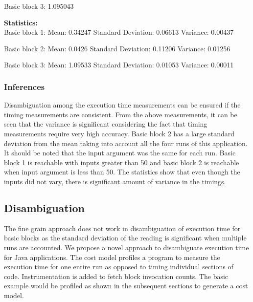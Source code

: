 Basic block 3: 1.095043

\textbf{Statistics: }\\

Basic block 1:
\hspace{2em} Mean: 0.34247
\hspace{2em} Standard Deviation: 0.06613
\hspace{2em} Variance: 0.00437

Basic block 2:
\hspace{2em} Mean: 0.0426
\hspace{2em} Standard Deviation: 0.11206
\hspace{2em} Variance: 0.01256

Basic block 3:
\hspace{2em} Mean: 1.09533
\hspace{2em} Standard Deviation: 0.01053
\hspace{2em} Variance: 0.00011

\subsubsection{Inferences}
Disambiguation among the execution time measurements can be ensured if the timing measurements are consistent. From the above measurements, it can be seen that the variance is significant considering the fact that timing measurements require very high accuracy. Basic block 2 has a large standard deviation from the mean taking into account all the four runs of this application. It should be noted that the input argument was the same for each run. Basic block 1 is reachable with inputs greater than 50 and basic block 2 is reachable when input argument is less than 50. The statistics show that even though the inputs did not vary, there is significant amount of variance in the timings.

\subsection{Disambiguation}
The fine grain approach does not work in disambiguation of execution time for basic blocks as the standard deviation of the reading is significant when multiple runs are accounted. We propose a novel approach to disambiguate execution time for Java applications. The cost model profiles a program to measure the execution time for one entire run as opposed to timing individual sections of code. Instrumentation is added to fetch block invocation counts.  \newline
The basic example would be profiled as shown in the subsequent sections to generate a cost model.

